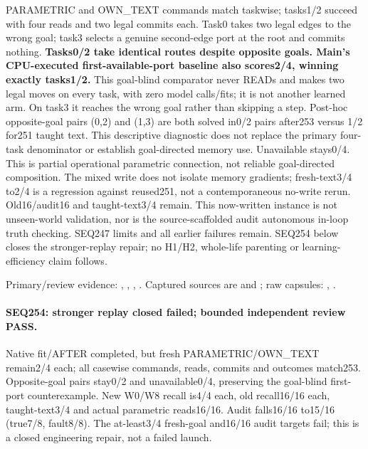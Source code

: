 \documentclass[11pt]{article}
\begin{document}
PARAMETRIC and OWN\_TEXT commands match taskwise; tasks1/2 succeed with four
reads and two legal commits each. Task0 takes two legal edges to the wrong
goal; task3 selects a genuine second-edge port at the root and commits nothing.
\textbf{Tasks0/2 take identical routes despite opposite goals. Main's
CPU-executed first-available-port baseline also scores2/4, winning exactly
tasks1/2.} This goal-blind comparator never READs and makes two legal moves
on every task, with zero model calls/fits; it is not another learned arm.
On task3 it reaches the wrong goal rather than skipping a step. Post-hoc
opposite-goal pairs (0,2) and (1,3) are both solved in0/2 pairs after253 versus
1/2 for251 taught text. This descriptive diagnostic does not replace the
primary four-task denominator or establish goal-directed memory use.
Unavailable stays0/4. This is partial operational
parametric connection, not reliable goal-directed composition. The mixed
write does not isolate memory gradients; fresh-text3/4 to2/4 is a regression
against reused251, not a contemporaneous no-write rerun. Old16/audit16 and
taught-text3/4 remain. This now-written instance is not unseen-world
validation, nor is the source-scaffolded audit autonomous in-loop truth checking.
SEQ247 limits and all earlier failures remain. SEQ254 below closes the
stronger-replay repair; no H1/H2, whole-life parenting or learning-efficiency
claim follows.

Primary/review evidence:
,
,
,
.
Captured sources are and
; raw capsules:
,
.

\paragraph{SEQ254: stronger replay closed failed; bounded independent review PASS.}
Native fit/AFTER completed, but fresh PARAMETRIC/OWN\_TEXT remain2/4 each;
all casewise commands, reads, commits and outcomes match253. Opposite-goal
pairs stay0/2 and unavailable0/4, preserving the goal-blind first-port
counterexample. New W0/W8 recall is4/4 each, old recall16/16 each,
taught-text3/4 and actual parametric reads16/16. Audit falls16/16 to15/16
(true7/8, fault8/8). The at-least3/4 fresh-goal and16/16 audit targets fail;
this is a closed engineering repair, not a failed launch.
\end{document}
